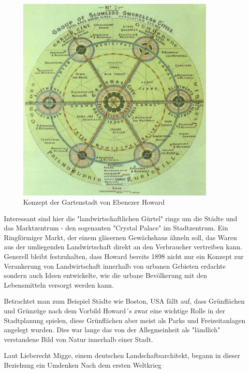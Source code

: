 \documentclass{article}
\begin{document}
\begin{figure}[htp]
\centering
\includegraphics[width=10cm]{image_folder/GardenCityConcept_EbenezerHoward.jpg}
\caption{Konzept der Gartenstadt von Ebenezer Howard}
\label{fig:GardenCityConcept_EbenezerHoward}
\end{figure}

Interessant sind hier die "landwirtschaftlichen Gürtel" rings um die Städte und das Marktzentrum - den sogenanten "Crystal Palace" im Stadtzentrum.
Ein Ringförmiger Markt, der einem gläsernen Gewächshaus ähneln soll, das Waren aus der umliegenden Landwirtschaft direkt an den Verbraucher vertreiben kann. Generell bleibt festzuhalten, dass Howard bereits 1898 nicht nur ein Konzept zur Verankerung von Landwirtschaft innerhalb von urbanen Gebieten erdachte sondern auch Ideen entwickelte, wie die urbane Bevölkerung mit den Lebensmitteln versorgt werden kann.

Betrachtet man zum Beispiel Städte wie Boston, USA fällt auf, dass Grünflächen und Grünzüge nach dem Vorbild Howard´s zwar eine wichtige Rolle in der Stadtplanung spielen, diese Grünflächen aber meist als Parks und Freizeitanlagen angelegt wurden. Dies war lange das von der Allegmeinheit als "ländlich" verstandene Bild von Natur innerhalb einer Stadt.

Laut Lieberecht Migge, einem deutschen Landschaftsarchitekt, begann in dieser Beziehung ein Umdenken Nach dem ersten Weltkrieg



\newpage
\listoffigures
\printbibliography
\end{document}
